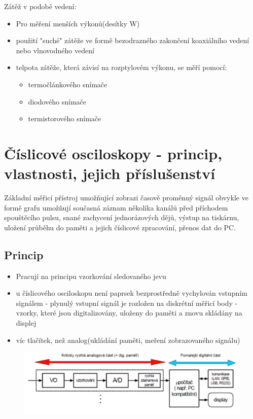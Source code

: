 Zátěž v podobě vedení:
\begin{itemize}
    \item Pro měření menších výkonů(desítky W)
    \item použití "suché" zátěže ve formě bezodrazného zakončení koaxiálního vedení nebo vlnovodného vedení
    \item telpota zátěže, která závisí na rozptylovém výkonu, se měří pomocí:
          \begin{itemize}
              \item termočlánkového snímače
              \item diodového snímače
              \item termistorového snímače
          \end{itemize}
\end{itemize}


\section{Číslicové osciloskopy - princip, vlastnosti, jejich příslušenství}
Základní měřicí přístroj umožňující zobrazi časově proměnný signál obvykle ve formě grafu
umožňují současná záznam několika kanálů před příchodem spouštěcího pulsu, snané zachycení jednorázových dějů, výstup na tiskárnu, uložení průběhu do paměti a jejich číslicové zpracování, přenos dat do PC.\\
\subsection*{Princip}
\begin{itemize}
    \item Pracují na principu vzorkování sledovaného jevu
    \item u číslicového osciloskopu není paprsek bezprostředně vychylován vstupním signálem - plynulý vstupní signál je rozložen na diskrétní měřicí body - vzorky, které jsou digitalizovány, uloženy do paměti a znovu skládány na displej 
    \item víc tlačítek, než analog(ukládání paměti, meření zobrazovaného signálu)
\end{itemize}
\begin{figure}[H]
    \includegraphics*[scale = 1]{images/osciloskopSchema.png}
\end{figure}
\newpage

